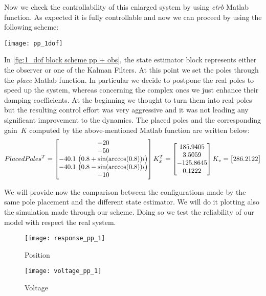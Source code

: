 Now we check the controllability of this enlarged system by using \textit{ctrb} Matlab function.
As expected it is fully controllable and now we can proceed by using the following scheme:
\begin{figure*}[h]
	\centering
	\texttt{[image: pp\_1dof]}
	\caption{\onedof\ block-scheme, with pole placement and state reconstruction}
	\label{fig:1_dof block scheme pp + obs}
\end{figure*}

In \cref{fig:1_dof block scheme pp + obs}, the state estimator block represents either the observer or one of the Kalman Filters. 
At this point we set the poles through the \textit{place} Matlab function. In particular we decide to postpone the real poles to speed up the system, whereas concerning the complex ones we just enhance their damping coefficients. At the beginning we thought to turn them into real poles but the resulting control effort was very aggressive and it was not leading any significant improvement to the dynamics. The placed poles and the corresponding gain~$K$ computed by the above-mentioned Matlab function are written below:
\begin{equation}
	PlacedPoles^{T} =
	\begin{bmatrix}
		-20 \\ -50 \\ -40.1\ \bigl{(} 0.8+\sin(\arccos(0.8))i \bigr{)} \\ -40.1\ \bigl{(} 0.8-\sin(\arccos(0.8))i \bigr{)} \\-10  
	\end{bmatrix}
	K_x^{T} =
	\begin{bmatrix}
		185.9405 \\  3.5059 \\ -125.8645 \\ 0.1222
	\end{bmatrix}
	\\
	K_v =
	\begin{bmatrix}
		286.2122
	\end{bmatrix}
\end{equation}

We will provide now the comparison between the configurations made by the same pole placement and the different state estimator. We will do it plotting also the simulation made through our scheme. Doing so we test the reliability of our model with respect the real system.
\begin{figure*}[h]
	\centering
	\begin{subfigure}{0.45\columnwidth}
		\texttt{[image: response\_pp\_1]}
		\caption{Position}
	\end{subfigure}
	\begin{subfigure}{0.45\columnwidth}
		\texttt{[image: voltage\_pp\_1]}
		\caption{Voltage}
	\end{subfigure}
	\caption{Position step response with full-state observer}
	\label{fig:Position step response with full-state observer}
\end{figure*}

